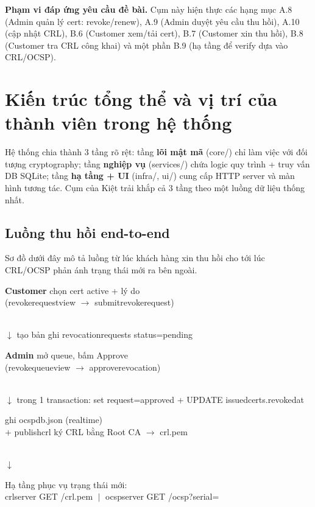 \documentclass[12pt,a4paper]{article}
\newcommand{\code}[1]{{\ttfamily\small\def\_{\textunderscore\discretionary{}{}{}}#1}}
\newcommand{\flowbox}[2]{\colorbox{#1}{\parbox{8.4cm}{\centering #2}}}
\begin{document}
\begin{notebox}
\textbf{Phạm vi đáp ứng yêu cầu đề bài.} Cụm này hiện thực các hạng mục
A.8 (Admin quản lý cert: revoke/renew), A.9 (Admin duyệt yêu cầu thu hồi),
A.10 (cập nhật CRL), B.6 (Customer xem/tải cert), B.7 (Customer xin thu hồi),
B.8 (Customer tra CRL công khai) và một phần B.9 (hạ tầng để verify dựa vào
CRL/OCSP).
\end{notebox}

\section{Kiến trúc tổng thể và vị trí của thành viên trong hệ thống}

Hệ thống chia thành 3 tầng rõ rệt: tầng \textbf{lõi mật mã} (\code{core/}) chỉ
làm việc với đối tượng \code{cryptography}; tầng \textbf{nghiệp vụ}
(\code{services/}) chứa logic quy trình + truy vấn DB SQLite; tầng \textbf{hạ
tầng + UI} (\code{infra/}, \code{ui/}) cung cấp HTTP server và màn hình tương
tác. Cụm của Kiệt trải khắp cả 3 tầng theo một luồng dữ liệu thống nhất.

\subsection{Luồng thu hồi end-to-end}

Sơ đồ dưới đây mô tả luồng từ lúc khách hàng xin thu hồi cho tới lúc CRL/OCSP
phản ánh trạng thái mới ra bên ngoài.

\begin{center}
\flowbox{noteblue}{\textbf{Customer} chọn cert active + lý do\\
(\code{revoke\_request\_view} $\to$ \code{submit\_revoke\_request})}\\[4pt]
$\downarrow$ tạo bản ghi \code{revocation\_requests} status=\code{pending}\\[6pt]
\flowbox{warnbg}{\textbf{Admin} mở queue, bấm Approve\\
(\code{revoke\_queue\_view} $\to$ \code{approve\_revocation})}\\[4pt]
$\downarrow$ trong 1 transaction: set request=\code{approved} + UPDATE \code{issued\_certs.revoked\_at}\\[6pt]
\flowbox{okbg}{\code{sync\_ocsp\_db} ghi \code{ocsp\_db.json} (realtime)\\
$+$ \code{publish\_crl} ký CRL bằng Root CA $\to$ \code{crl.pem}}\\[4pt]
$\downarrow$\\[6pt]
\flowbox{codebg}{Hạ tầng phục vụ trạng thái mới:\\
\code{crl\_server} GET \code{/crl.pem} $\;|\;$ \code{ocsp\_server} GET \code{/ocsp?serial=}}
\end{center}
\end{document}
